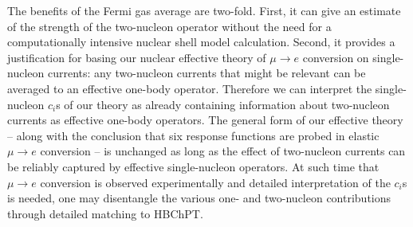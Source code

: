 \documentclass{book}[12pt]
\begin{document}
The benefits of the Fermi gas average are two-fold. First, it can give an estimate of the strength of the two-nucleon operator without the need for a computationally intensive nuclear shell model calculation. Second, it provides a justification for basing our nuclear effective theory of $\mu\rightarrow e$ conversion on single-nucleon currents: any two-nucleon currents that might be relevant can be averaged to an effective one-body operator. Therefore we can interpret the single-nucleon $c_i$s of our theory as already containing information about two-nucleon currents as effective one-body operators. The general form of our effective theory -- along with the conclusion that six response functions are probed in elastic $\mu\rightarrow e$ conversion -- is unchanged as long as the effect of two-nucleon currents can be reliably captured by effective single-nucleon operators. At such time that $\mu\rightarrow e$ conversion is observed experimentally and detailed interpretation of the $c_i$s is needed, one may disentangle the various one- and two-nucleon contributions through detailed matching to HBChPT.
\end{document}
